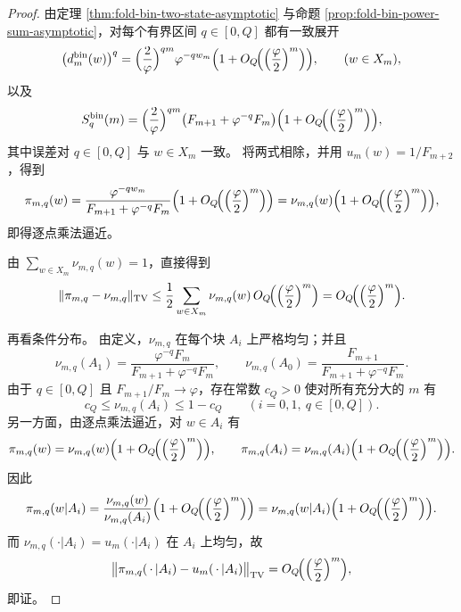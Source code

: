 \begin{proof}
由定理 \ref{thm:fold-bin-two-state-asymptotic} 与命题 \ref{prop:fold-bin-power-sum-asymptotic}，对每个有界区间 \(q\in[0,Q]\) 都有一致展开
\[
\bigl(d_m^{\mathrm{bin}}(w)\bigr)^q
=
\Bigl(\frac{2}{\varphi}\Bigr)^{qm}\varphi^{-q w_m}
\Bigl(1+O_Q\!\Bigl(\Bigl(\frac{\varphi}{2}\Bigr)^m\Bigr)\Bigr),
\qquad
(w\in X_m),
\]
以及
\[
S_q^{\mathrm{bin}}(m)
=
\Bigl(\frac{2}{\varphi}\Bigr)^{qm}
\bigl(F_{m+1}+\varphi^{-q}F_m\bigr)
\Bigl(1+O_Q\!\Bigl(\Bigl(\frac{\varphi}{2}\Bigr)^m\Bigr)\Bigr),
\]
其中误差对 \(q\in[0,Q]\) 与 \(w\in X_m\) 一致。
将两式相除，并用 \(u_m(w)=1/F_{m+2}\)，得到
\[
\pi_{m,q}(w)
=
\frac{\varphi^{-q w_m}}{F_{m+1}+\varphi^{-q}F_m}
\Bigl(1+O_Q\!\Bigl(\Bigl(\frac{\varphi}{2}\Bigr)^m\Bigr)\Bigr)
=
\nu_{m,q}(w)
\Bigl(1+O_Q\!\Bigl(\Bigl(\frac{\varphi}{2}\Bigr)^m\Bigr)\Bigr),
\]
即得逐点乘法逼近。

由 \(\sum_{w\in X_m}\nu_{m,q}(w)=1\)，直接得到
\[
\|\pi_{m,q}-\nu_{m,q}\|_{\mathrm{TV}}
\le
\frac12\sum_{w\in X_m}\nu_{m,q}(w)\,
O_Q\!\Bigl(\Bigl(\frac{\varphi}{2}\Bigr)^m\Bigr)
=
O_Q\!\Bigl(\Bigl(\frac{\varphi}{2}\Bigr)^m\Bigr).
\]

再看条件分布。
由定义，\(\nu_{m,q}\) 在每个块 \(A_i\) 上严格均匀；并且
\[
\nu_{m,q}(A_1)=\frac{\varphi^{-q}F_m}{F_{m+1}+\varphi^{-q}F_m},
\qquad
\nu_{m,q}(A_0)=\frac{F_{m+1}}{F_{m+1}+\varphi^{-q}F_m}.
\]
由于 \(q\in[0,Q]\) 且 \(F_{m+1}/F_m\to\varphi\)，存在常数 \(c_Q>0\) 使对所有充分大的 \(m\) 有
\[
c_Q\le \nu_{m,q}(A_i)\le 1-c_Q
\qquad
(i=0,1,\ q\in[0,Q]).
\]
另一方面，由逐点乘法逼近，对 \(w\in A_i\) 有
\[
\pi_{m,q}(w)=\nu_{m,q}(w)\Bigl(1+O_Q\!\Bigl(\Bigl(\frac{\varphi}{2}\Bigr)^m\Bigr)\Bigr),
\qquad
\pi_{m,q}(A_i)=\nu_{m,q}(A_i)\Bigl(1+O_Q\!\Bigl(\Bigl(\frac{\varphi}{2}\Bigr)^m\Bigr)\Bigr).
\]
因此
\[
\pi_{m,q}(w|A_i)
=
\frac{\nu_{m,q}(w)}{\nu_{m,q}(A_i)}
\Bigl(1+O_Q\!\Bigl(\Bigl(\frac{\varphi}{2}\Bigr)^m\Bigr)\Bigr)
=
\nu_{m,q}(w|A_i)
\Bigl(1+O_Q\!\Bigl(\Bigl(\frac{\varphi}{2}\Bigr)^m\Bigr)\Bigr).
\]
而 \(\nu_{m,q}(\cdot|A_i)=u_m(\cdot|A_i)\) 在 \(A_i\) 上均匀，故
\[
\bigl\|
\pi_{m,q}(\,\cdot\,|A_i)-u_m(\,\cdot\,|A_i)
\bigr\|_{\mathrm{TV}}
=
O_Q\!\Bigl(\Bigl(\frac{\varphi}{2}\Bigr)^m\Bigr),
\]
即证。
\end{proof}


